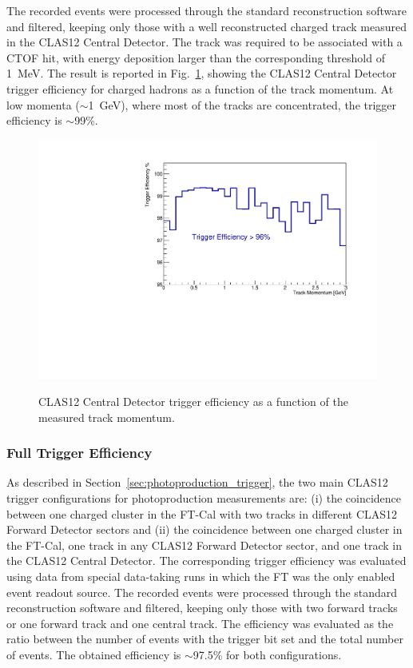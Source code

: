 The recorded events were processed through the standard reconstruction software and filtered, keeping
only those with a well reconstructed charged track measured in the CLAS12 Central Detector. The track
was required to be associated with a CTOF hit, with energy deposition larger than the corresponding threshold
of 1~MeV. The result is reported in Fig.~\ref{fig:CD_TrackEfficiency}, showing the CLAS12 Central Detector
trigger efficiency for charged hadrons as a function of the track momentum. At low momenta ($\sim$1~GeV),
where most of the tracks are concentrated, the trigger efficiency is $\sim$99\%.

\begin{figure}[!htb]
 \centering
{\includegraphics[width=.5\textwidth]{img/CD_TrackEfficiency.pdf}}
 \caption{CLAS12 Central Detector trigger efficiency as a function of the measured track momentum.}
 \label{fig:CD_TrackEfficiency}
\end{figure}

\subsubsection{Full Trigger Efficiency}

As described in Section~\ref{sec:photoproduction_trigger}, the two main CLAS12 trigger configurations for
photoproduction measurements are: (i) the coincidence between one charged cluster in the FT-Cal with two
tracks in different CLAS12 Forward Detector sectors and (ii) the coincidence between one charged cluster in
the FT-Cal, one track in any CLAS12 Forward Detector sector, and one track in the CLAS12 Central Detector.
The corresponding trigger efficiency was evaluated using data from special data-taking runs in which the FT
was the only enabled event readout source. The recorded events were processed through the standard
reconstruction software and filtered, keeping only those with two forward tracks or one forward track and one
central track. The efficiency was evaluated as the ratio between the number of events with the trigger bit set
and the total number of events. The obtained efficiency is $\sim$97.5\% for both configurations. 
